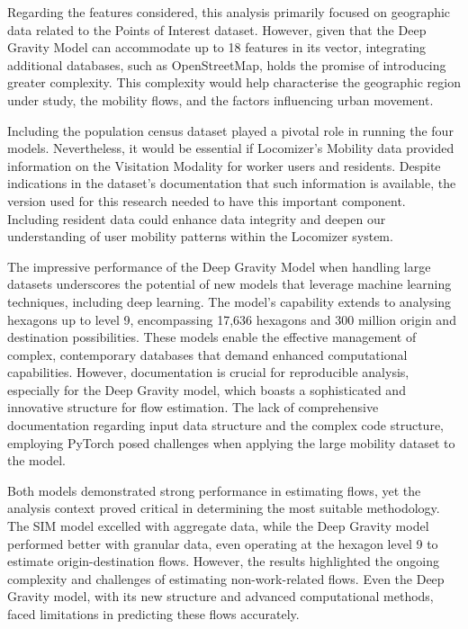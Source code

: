         Regarding the features considered, this analysis primarily focused on geographic data related to the Points of Interest dataset. However, given that the Deep Gravity Model can accommodate up to 18 features in its vector, integrating additional databases, such as OpenStreetMap, holds the promise of introducing greater complexity. This complexity would help characterise the geographic region under study, the mobility flows, and the factors influencing urban movement.

        Including the population census dataset played a pivotal role in running the four models. Nevertheless, it would be essential if Locomizer's Mobility data provided information on the Visitation Modality for worker users and residents. Despite indications in the dataset's documentation that such information is available, the version used for this research needed to have this important component. Including resident data could enhance data integrity and deepen our understanding of user mobility patterns within the Locomizer system.

        The impressive performance of the Deep Gravity Model when handling large datasets underscores the potential of new models that leverage machine learning techniques, including deep learning. The model's capability extends to analysing hexagons up to level 9, encompassing 17,636 hexagons and 300 million origin and destination possibilities. These models enable the effective management of complex, contemporary databases that demand enhanced computational capabilities. However, documentation is crucial for reproducible analysis, especially for the Deep Gravity model, which boasts a sophisticated and innovative structure for flow estimation. The lack of comprehensive documentation regarding input data structure and the complex code structure, employing PyTorch posed challenges when applying the large mobility dataset to the model.

        Both models demonstrated strong performance in estimating flows, yet the analysis context proved critical in determining the most suitable methodology. The SIM model excelled with aggregate data, while the Deep Gravity model performed better with granular data, even operating at the hexagon level 9 to estimate origin-destination flows. However, the results highlighted the ongoing complexity and challenges of estimating non-work-related flows. Even the Deep Gravity model, with its new structure and advanced computational methods, faced limitations in predicting these flows accurately.

